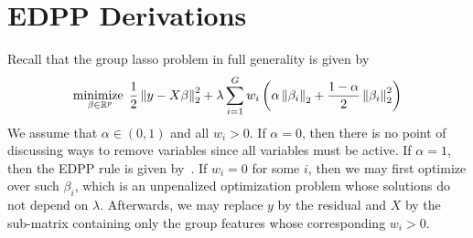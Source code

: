 
\section{EDPP Derivations}

Recall that the group lasso problem in full generality is given by
\begin{align}
    \operatorname*{minimize\;}\limits_{\beta \in \mathbb{R}^p}
    \frac{1}{2}
    \left\|y - X\beta\right\|_2^2 
    + 
    \lambda \sum\limits_{i=1}^G w_i \left(\alpha \left\|\beta_i\right\|_2 + \frac{1-\alpha}{2} \left\|\beta_i\right\|_2^2\right)
    \label{eq:appendix:edpp:objective}
\end{align}
We assume that $\alpha \in (0,1)$ and all $w_i > 0$.
If $\alpha = 0$, then there is no point of discussing ways to remove variables since
all variables must be active.
If $\alpha = 1$, then the EDPP rule is given by~\citet[Corollary 24]{wang:2015}.
If $w_i = 0$ for some $i$, then we may first optimize over such $\beta_i$,
which is an unpenalized optimization problem whose solutions do not depend on $\lambda$.
Afterwards, we may replace $y$ by the residual
and $X$ by the sub-matrix containing only the group features
whose corresponding $w_i > 0$.

